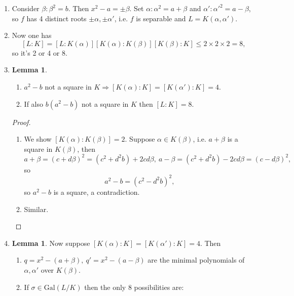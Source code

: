 \documentclass[a4paper]{article}
\newcommand{\gal}{\text{Gal}}
\theoremstyle{definition}
\newtheorem{lemma}[defn]{Lemma}
\begin{document}
\begin{enumerate}
\item Consider $\beta:\beta^2=b$. Then $x^2-a=\pm\beta$. Set $\alpha:\alpha^2=a+\beta$ and $\alpha':\alpha'^2=a-\beta$, so $f$ has 4 distinct roots $\pm\alpha,\pm\alpha'$, i.e. $f$ is separable and $L=K(\alpha,\alpha')$.
\item Now one has
\[
[L:K]=[L:K(\alpha)][K(\alpha):K(\beta)][K(\beta):K]\leq 2\times 2\times 2=8,
\]
so it's 2 or 4 or 8.
\item \begin{lemma}
\begin{enumerate}
\item $a^2-b$ not a square in $K\Rightarrow [K(\alpha):K]=[K(\alpha'):K]=4$.
\item If also $b(a^2-b)$ not a square in $K$ then $[L:K]=8$.
\end{enumerate}
\end{lemma}
\begin{proof}
\begin{enumerate}
\item We show $[K(\alpha):K(\beta)]=2$. Suppose $\alpha\in K(\beta)$, i.e. $a+\beta$ is a square in $K(\beta)$, then
\[
a+\beta=(c+d\beta)^2=(c^2+d^2b)+2cd\beta,\ a-\beta=(c^2+d^2b)-2cd\beta=(c-d\beta)^2,
\]
so
\[
a^2-b=\left(c^2-d^2b\right)^2,
\]
so $a^2-b$ is a square, a contradiction.
\item Similar.
\end{enumerate}
\end{proof}
\item \begin{lemma}
Now suppose $[K(\alpha):K]=[K(\alpha'):K]=4$. Then
\begin{enumerate}
\item $q=x^2-(a+\beta),\ q'=x^2-(a-\beta)$ are the minimal polynomials of $\alpha,\alpha'$ over $K(\beta)$.
\item If $\sigma\in\gal(L/K)$ then the only 8 possibilities are:


\end{enumerate}
\end{lemma}
\end{enumerate}
\end{document}

